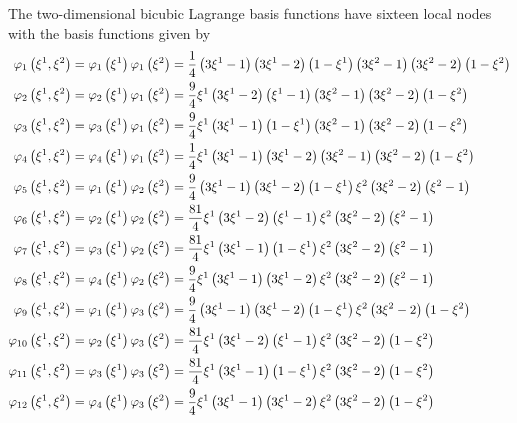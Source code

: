 The two-dimensional bicubic Lagrange basis functions have sixteen local nodes
with the basis functions given by
\begin{equation}
  \begin{split}
    \lbfn{1}{\xione,\xitwo}&=\lbfn{1}{\xione}\lbfn{1}{\xitwo}=
    \frac14\pbrac{3\xione-1}\pbrac{3\xione-2}\pbrac{1-\xione}\pbrac{3\xitwo-1}\pbrac{3\xitwo-2}\pbrac{1-\xitwo} \\
    \lbfn{2}{\xione,\xitwo}&=\lbfn{2}{\xione}\lbfn{1}{\xitwo}=
    \frac94\xione\pbrac{3\xione-2}\pbrac{\xione-1}\pbrac{3\xitwo-1}\pbrac{3\xitwo-2}\pbrac{1-\xitwo} \\
    \lbfn{3}{\xione,\xitwo}&=\lbfn{3}{\xione}\lbfn{1}{\xitwo}=
    \frac94\xione\pbrac{3\xione-1}\pbrac{1-\xione}\pbrac{3\xitwo-1}\pbrac{3\xitwo-2}\pbrac{1-\xitwo} \\
    \lbfn{4}{\xione,\xitwo}&=\lbfn{4}{\xione}\lbfn{1}{\xitwo}=
    \frac14\xione\pbrac{3\xione-1}\pbrac{3\xione-2}\pbrac{3\xitwo-1}\pbrac{3\xitwo-2}\pbrac{1-\xitwo} \\
    \lbfn{5}{\xione,\xitwo}&=\lbfn{1}{\xione}\lbfn{2}{\xitwo}=
    \frac94\pbrac{3\xione-1}\pbrac{3\xione-2}\pbrac{1-\xione}\xitwo\pbrac{3\xitwo-2}\pbrac{\xitwo-1} \\
    \lbfn{6}{\xione,\xitwo}&=\lbfn{2}{\xione}\lbfn{2}{\xitwo}=
    \frac{81}{4}\xione\pbrac{3\xione-2}\pbrac{\xione-1}\xitwo\pbrac{3\xitwo-2}\pbrac{\xitwo-1} \\
    \lbfn{7}{\xione,\xitwo}&=\lbfn{3}{\xione}\lbfn{2}{\xitwo}=
    \frac{81}{4}\xione\pbrac{3\xione-1}\pbrac{1-\xione}\xitwo\pbrac{3\xitwo-2}\pbrac{\xitwo-1} \\
    \lbfn{8}{\xione,\xitwo}&=\lbfn{4}{\xione}\lbfn{2}{\xitwo}=
    \frac94\xione\pbrac{3\xione-1}\pbrac{3\xione-2}\xitwo\pbrac{3\xitwo-2}\pbrac{\xitwo-1} \\
    \lbfn{9}{\xione,\xitwo}&=\lbfn{1}{\xione}\lbfn{3}{\xitwo}=
    \frac94\pbrac{3\xione-1}\pbrac{3\xione-2}\pbrac{1-\xione}\xitwo\pbrac{3\xitwo-2}\pbrac{1-\xitwo} \\
    \lbfn{10}{\xione,\xitwo}&=\lbfn{2}{\xione}\lbfn{3}{\xitwo}=
    \frac{81}{4}\xione\pbrac{3\xione-2}\pbrac{\xione-1}\xitwo\pbrac{3\xitwo-2}\pbrac{1-\xitwo} \\
    \lbfn{11}{\xione,\xitwo}&=\lbfn{3}{\xione}\lbfn{3}{\xitwo}=
    \frac{81}{4}\xione\pbrac{3\xione-1}\pbrac{1-\xione}\xitwo\pbrac{3\xitwo-2}\pbrac{1-\xitwo} \\
    \lbfn{12}{\xione,\xitwo}&=\lbfn{4}{\xione}\lbfn{3}{\xitwo}=
    \frac94\xione\pbrac{3\xione-1}\pbrac{3\xione-2}\xitwo\pbrac{3\xitwo-2}\pbrac{1-\xitwo} \\

\end{split}
\end{equation}

